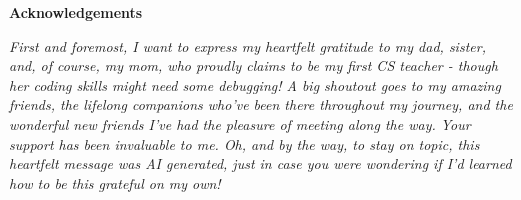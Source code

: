 \clearpage\null\newpage
\thispagestyle{empty}

\begin{center}
  {\bf \Huge Acknowledgements}
\end{center}

\vspace{4cm}

\emph{
  First and foremost, I want to express my heartfelt gratitude to my dad, sister, and, of course, my mom, who proudly claims to be my first CS teacher - though her coding skills might need some debugging! A big shoutout goes to my amazing friends, the lifelong companions who've been there throughout my journey, and the wonderful new friends I've had the pleasure of meeting along the way. Your support has been invaluable to me. Oh, and by the way, to stay on topic, this heartfelt message was AI generated, just in case you were wondering if I'd learned how to be this grateful on my own!
}

\clearpage\null\newpage
